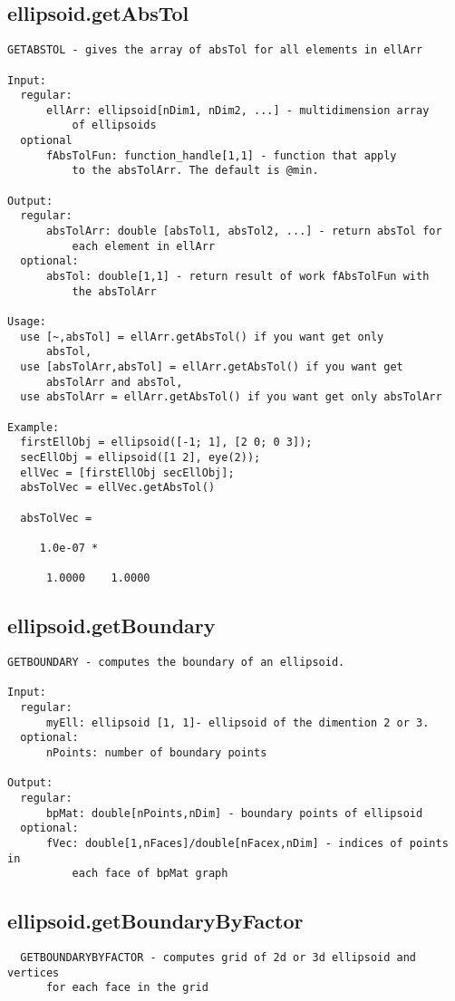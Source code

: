 \subsection{\texorpdfstring{ellipsoid.getAbsTol}{getAbsTol}}\label{method:ellipsoid.getAbsTol}
\begin{verbatim}
GETABSTOL - gives the array of absTol for all elements in ellArr

Input:
  regular:
      ellArr: ellipsoid[nDim1, nDim2, ...] - multidimension array
          of ellipsoids
  optional
      fAbsTolFun: function_handle[1,1] - function that apply
          to the absTolArr. The default is @min.

Output:
  regular:
      absTolArr: double [absTol1, absTol2, ...] - return absTol for
          each element in ellArr
  optional:
      absTol: double[1,1] - return result of work fAbsTolFun with
          the absTolArr

Usage:
  use [~,absTol] = ellArr.getAbsTol() if you want get only
      absTol,
  use [absTolArr,absTol] = ellArr.getAbsTol() if you want get
      absTolArr and absTol,
  use absTolArr = ellArr.getAbsTol() if you want get only absTolArr

Example:
  firstEllObj = ellipsoid([-1; 1], [2 0; 0 3]);
  secEllObj = ellipsoid([1 2], eye(2));
  ellVec = [firstEllObj secEllObj];
  absTolVec = ellVec.getAbsTol()

  absTolVec =

     1.0e-07 *

      1.0000    1.0000
\end{verbatim}
\subsection{\texorpdfstring{ellipsoid.getBoundary}{getBoundary}}\label{method:ellipsoid.getBoundary}
\begin{verbatim}
GETBOUNDARY - computes the boundary of an ellipsoid.

Input:
  regular:
      myEll: ellipsoid [1, 1]- ellipsoid of the dimention 2 or 3.
  optional:
      nPoints: number of boundary points

Output:
  regular:
      bpMat: double[nPoints,nDim] - boundary points of ellipsoid
  optional:
      fVec: double[1,nFaces]/double[nFacex,nDim] - indices of points in
          each face of bpMat graph
\end{verbatim}
\subsection{\texorpdfstring{ellipsoid.getBoundaryByFactor}{getBoundaryByFactor}}\label{method:ellipsoid.getBoundaryByFactor}
\begin{verbatim}
  GETBOUNDARYBYFACTOR - computes grid of 2d or 3d ellipsoid and vertices
      for each face in the grid
\end{verbatim}
